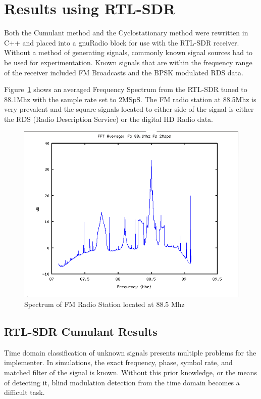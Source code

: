 \section*{Results using RTL-SDR}

Both the Cumulant method and the Cyclostationary method were rewritten in C++
and placed into a gnuRadio block for use with the RTL-SDR receiver.  Without a
method of generating signals, commonly known signal sources had to be used for
experimentation.  Known signals that are within the frequency range of
the receiver included FM Broadcasts and the BPSK modulated RDS data.

Figure~\ref{fig:SignalOfInterest} shows an averaged Frequency Spectrum from the
RTL-SDR tuned to 88.1Mhz with the sample rate set to 2MSpS.  The FM radio
station at 88.5Mhz is very prevalent and the square signals located to either
side of the signal is either the RDS (Radio Description Service) or the
digital HD Radio data.  

\begin{figure}
\centering
\includegraphics[width=\linewidth]{../img/Report_RTL_SDR_FFT_881M_2Msps.png}
\caption{Spectrum of FM Radio Station located at 88.5 Mhz}
\label{fig:SignalOfInterest}
\end{figure}


\subsection*{RTL-SDR Cumulant Results}

Time domain classification of unknown signals presents multiple problems
for the implementer.  In simulations, the exact frequency, phase, symbol rate,
and matched filter of the signal is known.  Without this prior knowledge, or the
means of detecting it, blind modulation detection from the time domain becomes a
difficult task.
 
